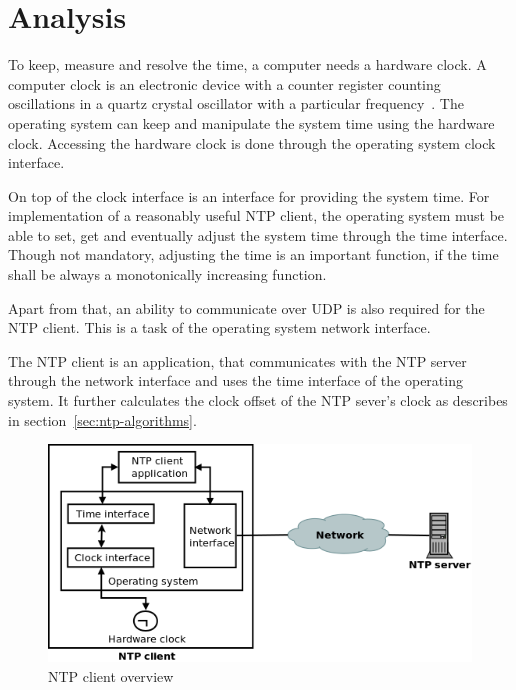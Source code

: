 
\chapter{Analysis}
To keep, measure and resolve the time, a computer needs a hardware clock.
A computer clock is an electronic device with a counter register counting oscillations in a
quartz crystal oscillator with a particular frequency~\cite{thesis-sync}.
The operating system can keep and manipulate the system time using the hardware clock.
Accessing the hardware clock is done through the operating system clock interface.

On top of the clock interface is an interface for providing the system time.
For implementation of a reasonably useful NTP client,
the operating system must be able to set, get and eventually adjust the system time
through the time interface.
Though not mandatory, adjusting the time is an important function,
if the time shall be always a monotonically increasing function.

Apart from that, an ability to communicate over UDP is also required for the NTP client.
This is a task of the operating system network interface.

The NTP client is an application, that communicates with the NTP server through the network interface
and uses the time interface of the operating system.
It further calculates the clock offset of the NTP sever's clock
as describes in section~\ref{sec:ntp-algorithms}.

\begin{figure}
  \centering
  \includegraphics[width=13cm,keepaspectratio]{fig/analysis.png}
  \caption{NTP client overview} %
  \label{fig:analysis-overview} %
\end{figure}

